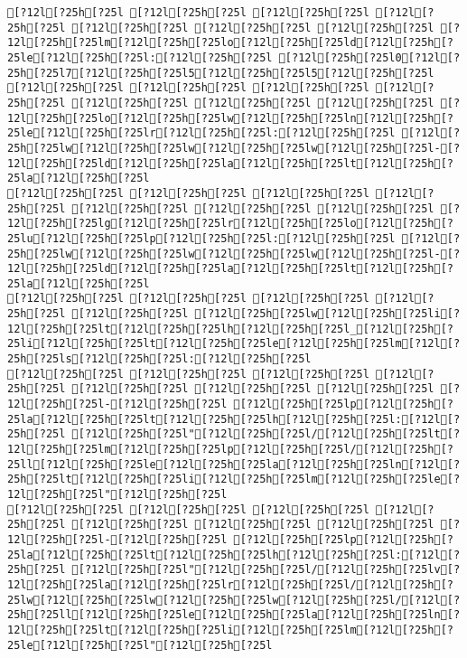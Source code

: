 \documentclass{scrartcl}
\begin{document}
\begin{Verbatim}
[?12l[?25h[?25l [?12l[?25h[?25l [?12l[?25h[?25l [?12l[?25h[?25l [?12l[?25h[?25l [?12l[?25h[?25l [?12l[?25h[?25l [?12l[?25h[?25lm[?12l[?25h[?25lo[?12l[?25h[?25ld[?12l[?25h[?25le[?12l[?25h[?25l:[?12l[?25h[?25l [?12l[?25h[?25l0[?12l[?25h[?25l7[?12l[?25h[?25l5[?12l[?25h[?25l5[?12l[?25h[?25l
[?12l[?25h[?25l [?12l[?25h[?25l [?12l[?25h[?25l [?12l[?25h[?25l [?12l[?25h[?25l [?12l[?25h[?25l [?12l[?25h[?25l [?12l[?25h[?25lo[?12l[?25h[?25lw[?12l[?25h[?25ln[?12l[?25h[?25le[?12l[?25h[?25lr[?12l[?25h[?25l:[?12l[?25h[?25l [?12l[?25h[?25lw[?12l[?25h[?25lw[?12l[?25h[?25lw[?12l[?25h[?25l-[?12l[?25h[?25ld[?12l[?25h[?25la[?12l[?25h[?25lt[?12l[?25h[?25la[?12l[?25h[?25l
[?12l[?25h[?25l [?12l[?25h[?25l [?12l[?25h[?25l [?12l[?25h[?25l [?12l[?25h[?25l [?12l[?25h[?25l [?12l[?25h[?25l [?12l[?25h[?25lg[?12l[?25h[?25lr[?12l[?25h[?25lo[?12l[?25h[?25lu[?12l[?25h[?25lp[?12l[?25h[?25l:[?12l[?25h[?25l [?12l[?25h[?25lw[?12l[?25h[?25lw[?12l[?25h[?25lw[?12l[?25h[?25l-[?12l[?25h[?25ld[?12l[?25h[?25la[?12l[?25h[?25lt[?12l[?25h[?25la[?12l[?25h[?25l
[?12l[?25h[?25l [?12l[?25h[?25l [?12l[?25h[?25l [?12l[?25h[?25l [?12l[?25h[?25l [?12l[?25h[?25lw[?12l[?25h[?25li[?12l[?25h[?25lt[?12l[?25h[?25lh[?12l[?25h[?25l_[?12l[?25h[?25li[?12l[?25h[?25lt[?12l[?25h[?25le[?12l[?25h[?25lm[?12l[?25h[?25ls[?12l[?25h[?25l:[?12l[?25h[?25l
[?12l[?25h[?25l [?12l[?25h[?25l [?12l[?25h[?25l [?12l[?25h[?25l [?12l[?25h[?25l [?12l[?25h[?25l [?12l[?25h[?25l [?12l[?25h[?25l-[?12l[?25h[?25l [?12l[?25h[?25lp[?12l[?25h[?25la[?12l[?25h[?25lt[?12l[?25h[?25lh[?12l[?25h[?25l:[?12l[?25h[?25l [?12l[?25h[?25l"[?12l[?25h[?25l/[?12l[?25h[?25lt[?12l[?25h[?25lm[?12l[?25h[?25lp[?12l[?25h[?25l/[?12l[?25h[?25ll[?12l[?25h[?25le[?12l[?25h[?25la[?12l[?25h[?25ln[?12l[?25h[?25lt[?12l[?25h[?25li[?12l[?25h[?25lm[?12l[?25h[?25le[?12l[?25h[?25l"[?12l[?25h[?25l
[?12l[?25h[?25l [?12l[?25h[?25l [?12l[?25h[?25l [?12l[?25h[?25l [?12l[?25h[?25l [?12l[?25h[?25l [?12l[?25h[?25l [?12l[?25h[?25l-[?12l[?25h[?25l [?12l[?25h[?25lp[?12l[?25h[?25la[?12l[?25h[?25lt[?12l[?25h[?25lh[?12l[?25h[?25l:[?12l[?25h[?25l [?12l[?25h[?25l"[?12l[?25h[?25l/[?12l[?25h[?25lv[?12l[?25h[?25la[?12l[?25h[?25lr[?12l[?25h[?25l/[?12l[?25h[?25lw[?12l[?25h[?25lw[?12l[?25h[?25lw[?12l[?25h[?25l/[?12l[?25h[?25ll[?12l[?25h[?25le[?12l[?25h[?25la[?12l[?25h[?25ln[?12l[?25h[?25lt[?12l[?25h[?25li[?12l[?25h[?25lm[?12l[?25h[?25le[?12l[?25h[?25l"[?12l[?25h[?25l

\end{Verbatim}
\end{document}

